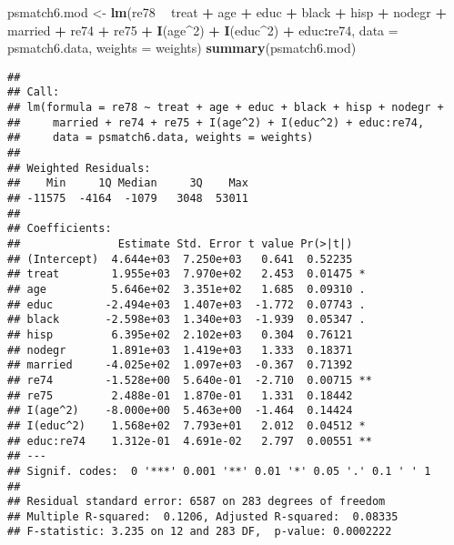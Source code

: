 \documentclass[]{article}
\newenvironment{Shaded}{\begin{snugshade}}{\end{snugshade}}
\newcommand{\DataTypeTok}[1]{\textcolor[rgb]{0.13,0.29,0.53}{#1}}
\newcommand{\DecValTok}[1]{\textcolor[rgb]{0.00,0.00,0.81}{#1}}
\newcommand{\KeywordTok}[1]{\textcolor[rgb]{0.13,0.29,0.53}{\textbf{#1}}}
\newcommand{\NormalTok}[1]{#1}
\newcommand{\OperatorTok}[1]{\textcolor[rgb]{0.81,0.36,0.00}{\textbf{#1}}}
\newcommand{\StringTok}[1]{\textcolor[rgb]{0.31,0.60,0.02}{#1}}
\begin{document}
\begin{Shaded}
\begin{Highlighting}[]
\NormalTok{psmatch6.mod <-}\StringTok{ }\KeywordTok{lm}\NormalTok{(re78 }\OperatorTok{~}\StringTok{ }\NormalTok{treat }\OperatorTok{+}\StringTok{ }\NormalTok{age }\OperatorTok{+}\StringTok{ }\NormalTok{educ }\OperatorTok{+}\StringTok{ }\NormalTok{black }\OperatorTok{+}\StringTok{ }\NormalTok{hisp }\OperatorTok{+}\StringTok{ }\NormalTok{nodegr }\OperatorTok{+}\StringTok{ }\NormalTok{married }\OperatorTok{+}\StringTok{ }\NormalTok{re74 }\OperatorTok{+}\StringTok{ }\NormalTok{re75 }\OperatorTok{+}\StringTok{ }
\StringTok{                     }\KeywordTok{I}\NormalTok{(age}\OperatorTok{^}\DecValTok{2}\NormalTok{) }\OperatorTok{+}\StringTok{ }\KeywordTok{I}\NormalTok{(educ}\OperatorTok{^}\DecValTok{2}\NormalTok{) }\OperatorTok{+}\StringTok{ }\NormalTok{educ}\OperatorTok{:}\NormalTok{re74, }
                   \DataTypeTok{data =}\NormalTok{ psmatch6.data, }\DataTypeTok{weights =}\NormalTok{ weights)}
\KeywordTok{summary}\NormalTok{(psmatch6.mod)}
\end{Highlighting}
\end{Shaded}

\begin{verbatim}
## 
## Call:
## lm(formula = re78 ~ treat + age + educ + black + hisp + nodegr + 
##     married + re74 + re75 + I(age^2) + I(educ^2) + educ:re74, 
##     data = psmatch6.data, weights = weights)
## 
## Weighted Residuals:
##    Min     1Q Median     3Q    Max 
## -11575  -4164  -1079   3048  53011 
## 
## Coefficients:
##               Estimate Std. Error t value Pr(>|t|)   
## (Intercept)  4.644e+03  7.250e+03   0.641  0.52235   
## treat        1.955e+03  7.970e+02   2.453  0.01475 * 
## age          5.646e+02  3.351e+02   1.685  0.09310 . 
## educ        -2.494e+03  1.407e+03  -1.772  0.07743 . 
## black       -2.598e+03  1.340e+03  -1.939  0.05347 . 
## hisp         6.395e+02  2.102e+03   0.304  0.76121   
## nodegr       1.891e+03  1.419e+03   1.333  0.18371   
## married     -4.025e+02  1.097e+03  -0.367  0.71392   
## re74        -1.528e+00  5.640e-01  -2.710  0.00715 **
## re75         2.488e-01  1.870e-01   1.331  0.18442   
## I(age^2)    -8.000e+00  5.463e+00  -1.464  0.14424   
## I(educ^2)    1.568e+02  7.793e+01   2.012  0.04512 * 
## educ:re74    1.312e-01  4.691e-02   2.797  0.00551 **
## ---
## Signif. codes:  0 '***' 0.001 '**' 0.01 '*' 0.05 '.' 0.1 ' ' 1
## 
## Residual standard error: 6587 on 283 degrees of freedom
## Multiple R-squared:  0.1206, Adjusted R-squared:  0.08335 
## F-statistic: 3.235 on 12 and 283 DF,  p-value: 0.0002222
\end{verbatim}
\end{document}
